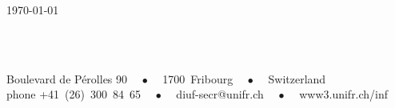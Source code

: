 \begin{titlepage}
\begin{center}
\today %
\vspace*{.06\textheight}

\groupname\\\deptname\\ %
\vfill

\footnotesize{ Boulevard de Pérolles 90 ~~$\bullet$~~ 1700~Fribourg ~~$\bullet$~~ Switzerland
            \\
            phone +41~(26)~300~84~65 ~~$\bullet$~~ \textsf{diuf-secr@unifr.ch} ~~$\bullet$~~ \textsf{www3.unifr.ch/inf}
            }


\end{center}
\end{titlepage}
